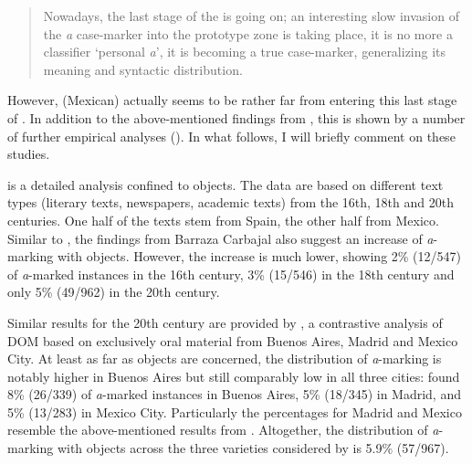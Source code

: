 \documentclass[output=paper]{LSP/langsci}
\begin{document}
\begin{quote}
Nowadays, the last stage of the  is going on; an interesting slow invasion of the \textit{a} case-marker into the prototype  zone is taking place, it is no more a classifier ‘personal \textit{a}’, it is becoming a true case-marker, generalizing its meaning and syntactic distribution. \citep[208]{Company2002Grammaticalization}
\end{quote}

However, (Mexican)  actually seems to be rather far from entering this last stage of . In addition to the above-mentioned findings from \citet[450]{Laca2006Objeto}, this is shown by a number of further empirical analyses (\cf \citealt{Buyse1998Accusative,Barraza2003Evolucion,Tippets2011Differential, GarciaGarcia2014Objektmarkierung}). In what follows, I will briefly comment on these studies.

\citet{Barraza2003Evolucion} is a detailed  analysis confined to  objects. The data are based on different text types (literary texts, newspapers, academic texts) from the 16th, 18th and 20th centuries. One half of the texts stem from Spain, the other half from Mexico. Similar to \citet{Company2002Avance,Company2002Grammaticalization}, the findings from Barraza Carbajal also suggest an increase of \textit{a}-marking with  objects. However, the increase is much lower, showing 2\% (12/547) of \textit{a}-marked instances in the 16th century, 3\% (15/546) in the 18th century and only 5\% (49/962) in the 20th century. 

Similar results for the 20th century are provided by \citet{Tippets2011Differential}, a contrastive analysis of DOM based on exclusively oral material from Buenos Aires, Madrid and Mexico City. At least as far as  objects are concerned, the distribution of \textit{a}-marking is notably higher in Buenos Aires but still comparably low in all three cities: \citet[113]{Tippets2011Differential} found 8\% (26/339) of \textit{a}-marked instances in Buenos Aires, 5\% (18/345) in Madrid, and 5\% (13/283) in Mexico City. Particularly the percentages for Madrid and Mexico resemble the above-mentioned results from \citet{Barraza2003Evolucion}. Altogether, the distribution of \textit{a}-marking with  objects across the three varieties considered by \citet{Tippets2011Differential} is 5.9\% (57/967).
\end{document}
